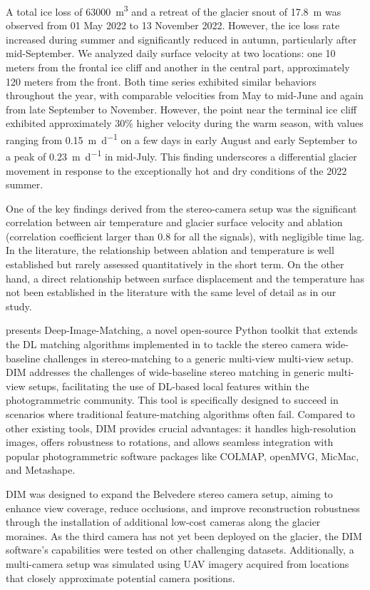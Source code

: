 A total ice loss of \SI{63000}{\cubic\meter} and a retreat of the glacier snout of \SI{17.8}{\meter} was observed from 01 May 2022 to 13 November 2022. 
However, the ice loss rate increased during summer and significantly reduced in autumn, particularly after mid-September. 
We analyzed daily surface velocity at two locations: one 10 meters from the frontal ice cliff and another in the central part, approximately 120 meters from the front. 
Both time series exhibited similar behaviors throughout the year, with comparable velocities from May to mid-June and again from late September to November.  
However, the point near the terminal ice cliff exhibited approximately 30\% higher velocity during the warm season,  with values ranging from \SI{0.15}{\meter\per\day} on a few days in early August and early September to a peak of \SI{0.23}{\meter\per\day} in mid-July.  
This finding underscores a differential glacier movement in response to the exceptionally hot and dry conditions of the 2022 summer.

One of the key findings derived from the stereo-camera setup was the significant correlation between air temperature and glacier surface velocity and ablation (correlation coefficient larger than 0.8 for all the signals), with negligible time lag. 
In the literature, the relationship between ablation and temperature is well established but rarely assessed quantitatively in the short term. 
On the other hand, a direct relationship between surface displacement and the temperature has not been established in the literature with the same level of detail as in our study.

 presents Deep-Image-Matching, a novel open-source Python toolkit that extends the DL matching algorithms implemented in  to tackle the stereo camera wide-baseline challenges in stereo-matching to a generic multi-view multi-view setup.
DIM addresses the challenges of wide-baseline stereo matching in generic multi-view setups, facilitating the use of DL-based local features within the photogrammetric community.
This tool is specifically designed to succeed in scenarios where traditional feature-matching algorithms often fail.
Compared to other existing tools, DIM provides crucial advantages: it handles high-resolution images, offers robustness to rotations, and allows seamless integration with popular photogrammetric software packages like COLMAP, openMVG, MicMac, and Metashape. 

DIM was designed to expand the Belvedere stereo camera setup, aiming to enhance view coverage, reduce occlusions, and improve reconstruction robustness through the installation of additional low-cost cameras along the glacier moraines.
As the third camera has not yet been deployed on the glacier, the DIM software's capabilities were tested on other challenging datasets. 
Additionally, a multi-camera setup was simulated using UAV imagery acquired from locations that closely approximate potential camera positions.

